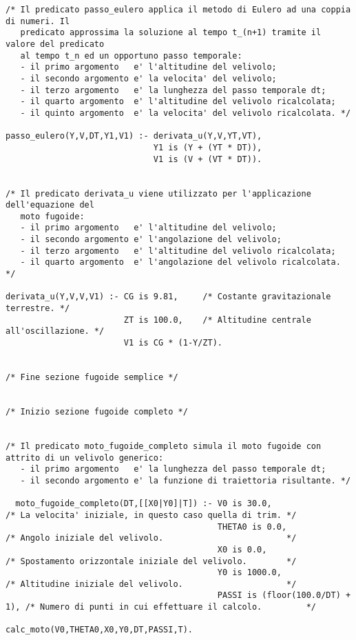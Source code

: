 \begin{verbatim}
/* Il predicato passo_eulero applica il metodo di Eulero ad una coppia di numeri. Il
   predicato approssima la soluzione al tempo t_(n+1) tramite il valore del predicato 
   al tempo t_n ed un opportuno passo temporale: 
   - il primo argomento   e' l'altitudine del velivolo;
   - il secondo argomento e' la velocita' del velivolo;
   - il terzo argomento   e' la lunghezza del passo temporale dt;
   - il quarto argomento  e' l'altitudine del velivolo ricalcolata;
   - il quinto argomento  e' la velocita' del velivolo ricalcolata. */

passo_eulero(Y,V,DT,Y1,V1) :- derivata_u(Y,V,YT,VT),
                              Y1 is (Y + (YT * DT)),
                              V1 is (V + (VT * DT)).


/* Il predicato derivata_u viene utilizzato per l'applicazione dell'equazione del 
   moto fugoide:
   - il primo argomento   e' l'altitudine del velivolo;
   - il secondo argomento e' l'angolazione del velivolo;
   - il terzo argomento   e' l'altitudine del velivolo ricalcolata;
   - il quarto argomento  e' l'angolazione del velivolo ricalcolata. */

derivata_u(Y,V,V,V1) :- CG is 9.81,     /* Costante gravitazionale terrestre. */
                        ZT is 100.0,    /* Altitudine centrale all'oscillazione. */
                        V1 is CG * (1-Y/ZT).


/* Fine sezione fugoide semplice */


/* Inizio sezione fugoide completo */


/* Il predicato moto_fugoide_completo simula il moto fugoide con attrito di un velivolo generico:
   - il primo argomento   e' la lunghezza del passo temporale dt;
   - il secondo argomento e' la funzione di traiettoria risultante. */

  moto_fugoide_completo(DT,[[X0|Y0]|T]) :- V0 is 30.0,                     /* La velocita' iniziale, in questo caso quella di trim. */
                                           THETA0 is 0.0,                  /* Angolo iniziale del velivolo.                         */
                                           X0 is 0.0,                      /* Spostamento orizzontale iniziale del velivolo.        */
                                           Y0 is 1000.0,                   /* Altitudine iniziale del velivolo.                     */
                                           PASSI is (floor(100.0/DT) + 1), /* Numero di punti in cui effettuare il calcolo.         */
                                           calc_moto(V0,THETA0,X0,Y0,DT,PASSI,T).



\end{verbatim}
